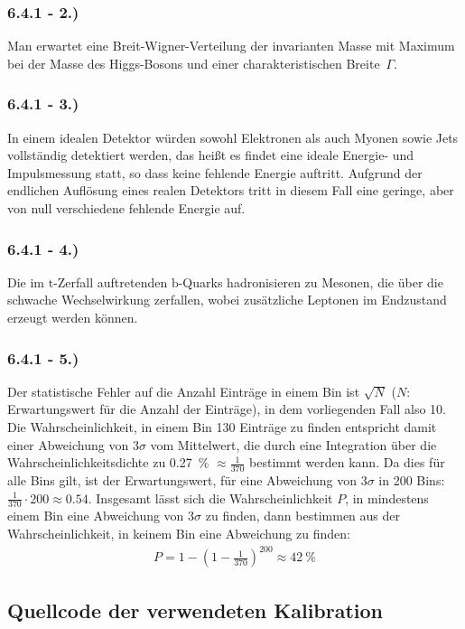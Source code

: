 \documentclass[11pt, a4paper]{article}
\numberwithin{equation}{section}
\begin{document}
\begin{appendix}
\subsubsection*{6.4.1 - 2.)}
Man erwartet eine Breit-Wigner-Verteilung der invarianten Masse mit Maximum bei der Masse des Higgs-Bosons und einer charakteristischen Breite~$\Gamma$.

\subsubsection*{6.4.1 - 3.)}
In einem idealen Detektor würden sowohl Elektronen als auch Myonen sowie Jets vollständig detektiert werden, das heißt es findet eine ideale Energie- und Impulsmessung statt, so dass keine fehlende Energie auftritt.
Aufgrund der endlichen Auflösung eines realen Detektors tritt in diesem Fall eine geringe, aber von null verschiedene fehlende Energie auf.

\subsubsection*{6.4.1 - 4.)}
Die im $\mathrm{t}$-Zerfall auftretenden $\mathrm{b}$-Quarks hadronisieren zu Mesonen, die über die schwache Wechselwirkung zerfallen, wobei zusätzliche Leptonen im Endzustand erzeugt werden können.

\subsubsection*{6.4.1 - 5.)}
Der statistische Fehler auf die Anzahl Einträge in einem Bin ist $\sqrt{N}$ ($N$: Erwartungswert für die Anzahl der Einträge), in dem vorliegenden Fall also \num{10}.
Die Wahrscheinlichkeit, in einem Bin \num{130} Einträge zu finden entspricht damit einer Abweichung von $3\sigma$ vom Mittelwert, die durch eine Integration über die Wahrscheinlichkeitsdichte zu \SI{0.27}{\percent} $\approx \frac{1}{370}$ bestimmt werden kann.
Da dies für alle Bins gilt, ist der Erwartungswert, für eine Abweichung von $3\sigma$ in \num{200} Bins: $\frac{1}{370} \cdot 200 \approx \num{0.54}$.
Insgesamt lässt sich die Wahrscheinlichkeit $P$, in mindestens einem Bin eine Abweichung von $3\sigma$ zu finden, dann bestimmen aus der Wahrscheinlichkeit, in keinem Bin eine Abweichung zu finden:
\begin{align*}
	P = 1 - \left(1 - \frac{1}{370}\right)^{200} \approx \SI{42}{\percent}
\end{align*}

\clearpage
\subsection{Quellcode der verwendeten Kalibration}
\label{sec:quellcode_kalibration}


\end{appendix}
\end{document}
